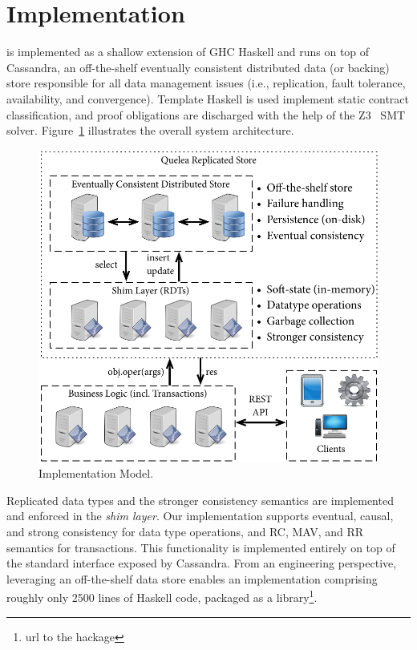 \section{Implementation}
\label{sec:impl}

\name is implemented as a shallow extension of GHC Haskell and runs on top of
Cassandra, an off-the-shelf eventually consistent distributed data (or backing)
store responsible for all data management issues (i.e., replication, fault
tolerance, availability, and convergence).  Template Haskell is used implement
static contract classification, and proof obligations are discharged with the
help of the Z3~\cite{Z3} SMT solver. Figure~\ref{fig:impl_mod} illustrates the
overall system architecture.

\begin{figure}
\begin{center}
\includegraphics[width=0.7\columnwidth]{Figures/ImplModel}
\end{center}
\caption{Implementation Model.}
\label{fig:impl_mod}
\end{figure}

Replicated data types and the stronger consistency semantics are implemented
and enforced in the \emph{shim layer}. Our implementation supports eventual,
causal, and strong consistency for data type operations, and RC, MAV, and RR
semantics for transactions.  This functionality is implemented entirely on top
of the standard interface exposed by Cassandra. From an engineering
perspective, leveraging an off-the-shelf data store enables an implementation
comprising roughly only 2500 lines of Haskell code, packaged as a
library\footnote{url to the hackage}.


